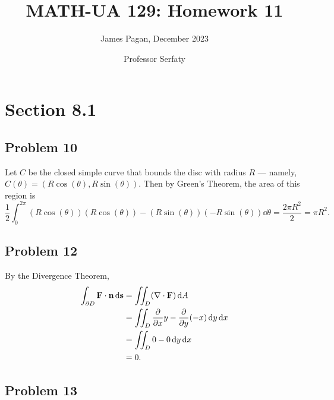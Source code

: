 \documentclass[11pt]{article}
\title{MATH-UA 129: Homework 11}
\author{James Pagan, December 2023}
\date{Professor Serfaty}
\renewcommand{\vec}[1]{\mathbf{#1}}
\renewcommand{\div}{\nabla \cdot}
\begin{document}
\maketitle
\tableofcontents
\newpage


\section{Section 8.1}


\subsection*{Problem 10}

Let $C$ be the closed simple curve that bounds the disc with radius $R$ --- namely, $C(\theta) = (R\cos(\theta), R\sin(\theta))$. Then by Green's Theorem, the area of this region is
\[
	\frac{1}{2} \int_{0}^{2\pi} (R \cos(\theta))(R \cos(\theta)) - (R \sin(\theta))(-R \sin(\theta)) \dd{\theta} = \frac{2\pi R^{2}}{2} = \boxed{\pi R^{2}}.
\]


\subsection*{Problem 12}

By the Divergence Theorem,
\begin{align*}
	\int_{\partial D} \mathbf{F} \cdot \vec{n} \dd{\vec{s}} &= \iint_{D} (\div \mathbf{F}) \dd{A} \\
	&= \iint_{D} \pdv{x} y - \pdv{y} (-x) \dd{y} \dd{x} \\
	&= \iint_{D} 0 - 0 \dd{y} \dd{x} \\
	&= 0.
\end{align*}


\subsection*{Problem 13}
\end{document}
